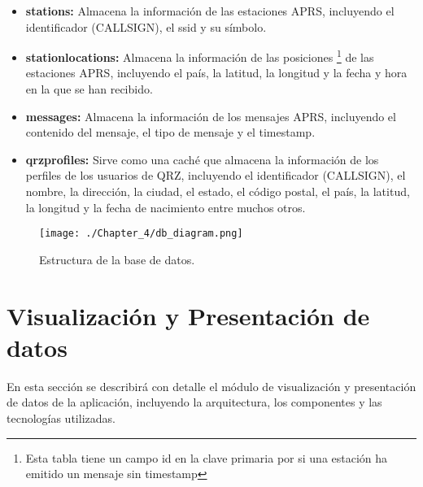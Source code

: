 \begin{itemize}
	\item \textbf{stations:} Almacena la información de las estaciones APRS, incluyendo el identificador (CALLSIGN), el ssid y su símbolo.
	\item \textbf{station\textunderscore locations:} Almacena la información de las posiciones \footnote[1]{Esta tabla tiene un campo id en la clave primaria por si una estación ha emitido un mensaje sin timestamp} de las estaciones APRS, incluyendo el país, la latitud, la longitud y la fecha y hora en la que se han recibido.
	\item \textbf{messages:} Almacena la información de los mensajes APRS, incluyendo el contenido del mensaje, el tipo de mensaje y el timestamp.
	\item \textbf{qrz\textunderscore profiles:} Sirve como una caché que almacena la información de los perfiles de los usuarios de QRZ, incluyendo el identificador (CALLSIGN), el nombre, la dirección, la ciudad, el estado, el código postal, el país, la latitud, la longitud y la fecha de nacimiento entre muchos otros.
\end{itemize}

\begin{figure}[!h]
	\centering
	\texttt{[image: ./Chapter\_4/db\_diagram.png]}
	\caption{Estructura de la base de datos.}
	\label{fig:db-model}
\end{figure}

\section{Visualización y Presentación de datos}

En esta sección se describirá con detalle el módulo de visualización y presentación de datos de la aplicación, incluyendo la arquitectura, los componentes y las tecnologías utilizadas.

